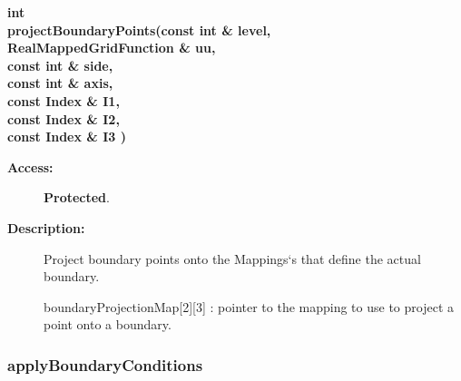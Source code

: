 \begin{flushleft} \textbf{%
int  \\ 
\settowidth{\EllipticGridGeneratorIncludeArgIndent}{projectBoundaryPoints(}%
projectBoundaryPoints(const int \& level,\\ 
\hspace{\EllipticGridGeneratorIncludeArgIndent}RealMappedGridFunction \& uu, \\ 
\hspace{\EllipticGridGeneratorIncludeArgIndent}const int \& side,  \\ 
\hspace{\EllipticGridGeneratorIncludeArgIndent}const int \& axis,\\ 
\hspace{\EllipticGridGeneratorIncludeArgIndent}const Index \& I1,\\ 
\hspace{\EllipticGridGeneratorIncludeArgIndent}const Index \& I2,\\ 
\hspace{\EllipticGridGeneratorIncludeArgIndent}const Index \& I3 )
}\end{flushleft}
\begin{description}
\item[{\bf Access:}]  {\bf Protected}.
\item[{\bf Description:}] 
   Project boundary points onto the Mappings`s that define the actual boundary.

 boundaryProjectionMap[2][3] : pointer to the mapping to use to project a point onto a boundary.
\end{description}
\subsubsection{applyBoundaryConditions}
 
